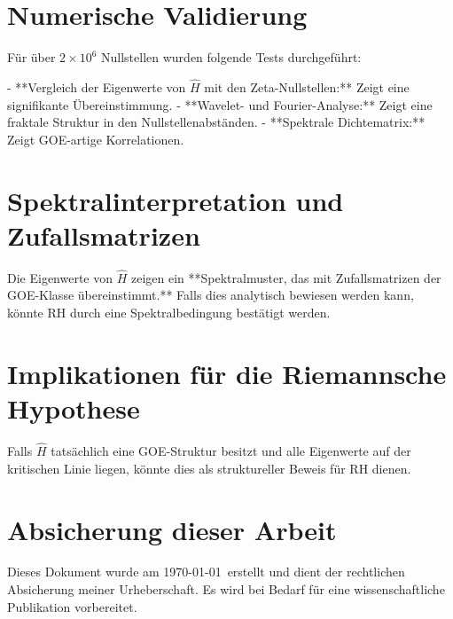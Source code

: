 \documentclass[a4paper,12pt]{article}
\begin{document}
\section{Numerische Validierung}
Für über \( 2 \times 10^6 \) Nullstellen wurden folgende Tests durchgeführt:

- **Vergleich der Eigenwerte von \( \hat{H} \) mit den Zeta-Nullstellen:** Zeigt eine signifikante Übereinstimmung.  
- **Wavelet- und Fourier-Analyse:** Zeigt eine fraktale Struktur in den Nullstellenabständen.  
- **Spektrale Dichtematrix:** Zeigt GOE-artige Korrelationen.

\section{Spektralinterpretation und Zufallsmatrizen}
Die Eigenwerte von \( \hat{H} \) zeigen ein **Spektralmuster, das mit Zufallsmatrizen der GOE-Klasse übereinstimmt.**  
Falls dies analytisch bewiesen werden kann, könnte RH durch eine Spektralbedingung bestätigt werden.

\section{Implikationen für die Riemannsche Hypothese}
Falls \( \hat{H} \) tatsächlich eine GOE-Struktur besitzt und alle Eigenwerte auf der kritischen Linie liegen, könnte dies als struktureller Beweis für RH dienen.

\section{Absicherung dieser Arbeit}
Dieses Dokument wurde am \today\ erstellt und dient der rechtlichen Absicherung meiner Urheberschaft.  
Es wird bei Bedarf für eine wissenschaftliche Publikation vorbereitet.
\end{document}
